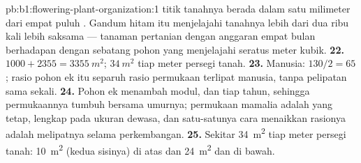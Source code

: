 \begin{solution}{pb:b1:flowering-plant-organization:1}
titik tanahnya berada dalam satu milimeter dari empat puluh .
Gandum hitam itu menjelajahi tanahnya lebih dari dua ribu kali lebih
saksama --- tanaman pertanian dengan anggaran empat bulan berhadapan
dengan sebatang pohon yang menjelajahi seratus meter kubik.
\textbf{22.} $1000 + 2355 = \qty{3355}{m^2}$; $\qty{34}{m^2}$ tiap
meter persegi tanah.
\textbf{23.} Manusia: $130/2 = 65$; rasio pohon ek itu separuh rasio
permukaan terlipat manusia, tanpa pelipatan sama sekali.
\textbf{24.} Pohon ek menambah modul,  dan  tiap tahun, sehingga
permukaannya tumbuh bersama umurnya; permukaan mamalia adalah 
yang tetap, lengkap pada ukuran dewasa, dan satu-satunya cara menaikkan
rasionya adalah melipatnya selama perkembangan.
\textbf{25.} Sekitar \qty{34}{m^2}  tiap meter
persegi tanah: \qty{10}{m^2}  (kedua sisinya) di atas dan
\qty{24}{m^2}  dan  di bawah.
\end{solution}
